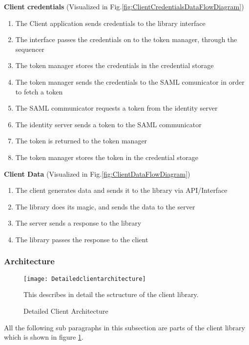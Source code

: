	\textbf{Client credentials} (Visualized in Fig.\ref{fig:ClientCredentialsDataFlowDiagram})
		\begin{enumerate}
			\item The Client application sends credentials to the library interface
			\item The interface passes the credentials on to the token manager, through the sequencer
			\item The token manager stores the credentials in the credential storage
			\item The token manager sends the credentials to the SAML comunicator in order to fetch a token
			\item The SAML communicator requests a token from the identity server
			\item The identity server sends a token to the SAML communicator
			\item The token is returned to the token manager
			\item The token manager stores the token in the credential storage
		\end{enumerate}
		
		\textbf{Client Data} (Visualized in Fig.\ref{fig:ClientDataFlowDiagram})
		\begin{enumerate}
			\item The client generates data and sends it to the library via API/Interface
			\item The library does its magic, and sends the data to the  server
			\item The server sends a response to the library
			\item The library passes the response to the client
		\end{enumerate}
		
	\subsubsection{Architecture}\label{client architecture}
		\begin{figure}[h]
			\centering	
			\texttt{[image: Detailedclientarchitecture]}
			\caption{Detailed Client Architecture}
			This describes in detail the sctructure of the client library. 
			\label{fig:DetailedClientArchitecture}
		\end{figure}

    All the following sub paragraphs in this subsection are parts of the client library which is shown in figure \ref{fig:DetailedClientArchitecture}.  \\ 
    
